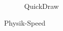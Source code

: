 \begin{figure}[!ht]
\begin{subfigure}[b]{0.3\textwidth}
        \caption{QuickDraw}
    \end{subfigure}
    \caption{Physik-Speed}
    \label{fig:Physik-Speed}
\end{figure}

